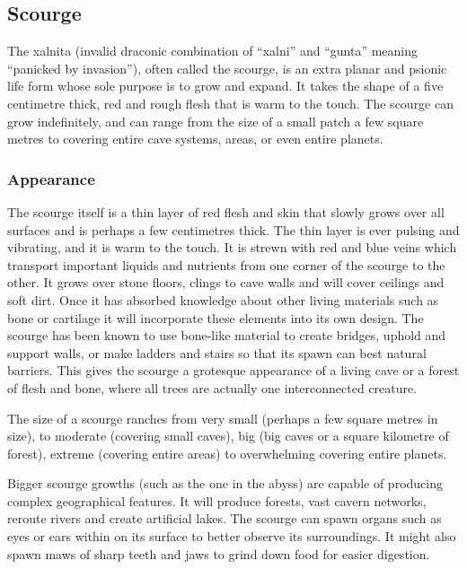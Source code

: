 \subsection{Scourge}
\label{sec:Scourge}

The xalnita (invalid draconic combination of ``xalni'' and ``gunta'' meaning
``panicked by invasion''), often called the scourge, is an extra planar and
psionic life form whose sole purpose is to grow and expand. It takes the shape
of a five centimetre thick, red and rough flesh that is warm to the touch. The
scourge can grow indefinitely, and can range from the size of a small patch a
few square metres to covering entire cave systems, areas, or even entire
planets.

\subsubsection{Appearance}

The scourge itself is a thin layer of red flesh and skin that slowly grows
over all surfaces and is perhaps a few centimetres thick. The thin layer
is ever pulsing and vibrating, and it is warm to the touch. It is strewn with
red and blue veins which transport important liquids and nutrients from one
corner of the scourge to the other. It grows over stone floors, clings to cave
walls and will cover ceilings and soft dirt. Once it has absorbed knowledge
about other living materials such as bone or cartilage it will incorporate
these elements into its own design. The scourge has been known to use
bone-like material to create bridges, uphold and support walls, or make
ladders and stairs so that its spawn can best natural barriers. This gives
the scourge a grotesque appearance of a living cave or a forest of flesh and
bone, where all trees are actually one interconnected creature.

The size of a scourge ranches from very small (perhaps a few square metres in
size), to moderate (covering small caves), big (big caves or a square kilometre
of forest), extreme (covering entire areas) to overwhelming covering entire
planets.

Bigger scourge growths (such as the one in the abyss) are capable of producing
complex geographical features. It will produce forests, vast cavern networks,
reroute rivers and create artificial lakes. The scourge can spawn organs such
as eyes or ears within on its surface to better observe its surroundings. It
might also spawn maws of sharp teeth and jaws to grind down food for easier
digestion.

